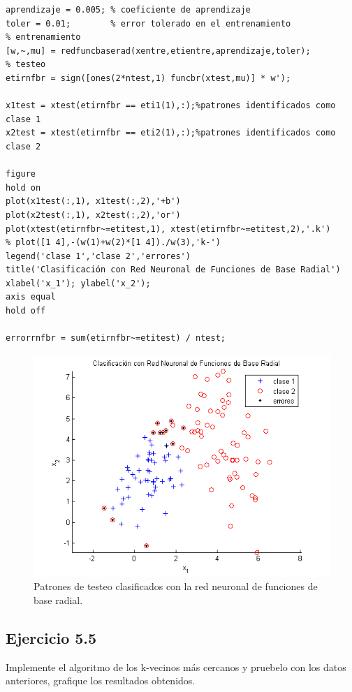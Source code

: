 \documentclass[11pt,a4paper,final]{article}
\begin{document}
\begin{verbatim}
aprendizaje = 0.005; % coeficiente de aprendizaje
toler = 0.01;        % error tolerado en el entrenamiento
% entrenamiento
[w,~,mu] = redfuncbaserad(xentre,etientre,aprendizaje,toler);
% testeo
etirnfbr = sign([ones(2*ntest,1) funcbr(xtest,mu)] * w');

x1test = xtest(etirnfbr == eti1(1),:);%patrones identificados como clase 1
x2test = xtest(etirnfbr == eti2(1),:);%patrones identificados como clase 2

figure
hold on
plot(x1test(:,1), x1test(:,2),'+b')
plot(x2test(:,1), x2test(:,2),'or')
plot(xtest(etirnfbr~=etitest,1), xtest(etirnfbr~=etitest,2),'.k')
% plot([1 4],-(w(1)+w(2)*[1 4])./w(3),'k-')
legend('clase 1','clase 2','errores')
title('Clasificación con Red Neuronal de Funciones de Base Radial')
xlabel('x_1'); ylabel('x_2');
axis equal
hold off

errorrnfbr = sum(etirnfbr~=etitest) / ntest;
\end{verbatim}

\begin{figure}
\includegraphics [width=\textwidth]{Ejercicio5_04.png}
\caption{Patrones de testeo clasificados con la red neuronal de funciones de base radial.}
\label{fig:ejercicio54}
\end{figure}


\subsection{Ejercicio 5.5}

Implemente el algoritmo de los k-vecinos más cercanos y pruebelo con los datos anteriores, grafique los resultados obtenidos.
\end{document}
